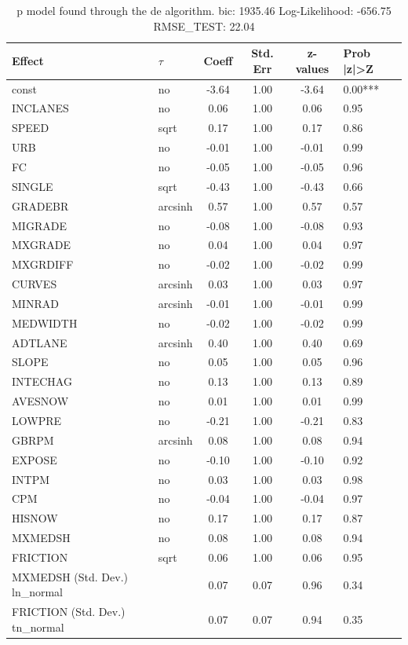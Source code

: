 \begin{table}
	\caption{p model found through the de algorithm. bic: 1935.46 Log-Likelihood: -656.75 RMSE_TEST: 22.04}
	\begin{center}
		\begin{tabular}{|l|l|c|c|c|l|}
			\hline
			Effect & $\tau$ & Coeff & Std. Err & z-values & Prob |z|>Z \\
			\hline
			const & no & -3.64 & 1.00 & -3.64 & 0.00*** \\
			\hline
			INCLANES & no & 0.06 & 1.00 & 0.06 & 0.95 \\
			\hline
			SPEED & sqrt & 0.17 & 1.00 & 0.17 & 0.86 \\
			\hline
			URB & no & -0.01 & 1.00 & -0.01 & 0.99 \\
			\hline
			FC & no & -0.05 & 1.00 & -0.05 & 0.96 \\
			\hline
			SINGLE & sqrt & -0.43 & 1.00 & -0.43 & 0.66 \\
			\hline
			GRADEBR & arcsinh & 0.57 & 1.00 & 0.57 & 0.57 \\
			\hline
			MIGRADE & no & -0.08 & 1.00 & -0.08 & 0.93 \\
			\hline
			MXGRADE & no & 0.04 & 1.00 & 0.04 & 0.97 \\
			\hline
			MXGRDIFF & no & -0.02 & 1.00 & -0.02 & 0.99 \\
			\hline
			CURVES & arcsinh & 0.03 & 1.00 & 0.03 & 0.97 \\
			\hline
			MINRAD & arcsinh & -0.01 & 1.00 & -0.01 & 0.99 \\
			\hline
			MEDWIDTH & no & -0.02 & 1.00 & -0.02 & 0.99 \\
			\hline
			ADTLANE & arcsinh & 0.40 & 1.00 & 0.40 & 0.69 \\
			\hline
			SLOPE & no & 0.05 & 1.00 & 0.05 & 0.96 \\
			\hline
			INTECHAG & no & 0.13 & 1.00 & 0.13 & 0.89 \\
			\hline
			AVESNOW & no & 0.01 & 1.00 & 0.01 & 0.99 \\
			\hline
			LOWPRE & no & -0.21 & 1.00 & -0.21 & 0.83 \\
			\hline
			GBRPM & arcsinh & 0.08 & 1.00 & 0.08 & 0.94 \\
			\hline
			EXPOSE & no & -0.10 & 1.00 & -0.10 & 0.92 \\
			\hline
			INTPM & no & 0.03 & 1.00 & 0.03 & 0.98 \\
			\hline
			CPM & no & -0.04 & 1.00 & -0.04 & 0.97 \\
			\hline
			HISNOW & no & 0.17 & 1.00 & 0.17 & 0.87 \\
			\hline
			MXMEDSH & no & 0.08 & 1.00 & 0.08 & 0.94 \\
			\hline
			FRICTION & sqrt & 0.06 & 1.00 & 0.06 & 0.95 \\
			\hline
			MXMEDSH (Std. Dev.) ln_normal &  & 0.07 & 0.07 & 0.96 & 0.34 \\
			\hline
			FRICTION (Std. Dev.) tn_normal &  & 0.07 & 0.07 & 0.94 & 0.35 \\
			\hline
		\end{tabular}
	\end{center}
\end{table}